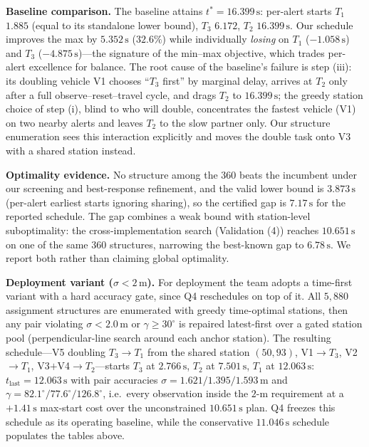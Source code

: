 \textbf{Baseline comparison.} The baseline attains $t^{*}=16.399\,\mathrm{s}$: per-alert
starts $T_1$ $1.885$ (equal to its standalone lower bound), $T_3$ $6.172$, $T_2$
$16.399\,\mathrm{s}$. Our schedule improves the max by $5.352\,\mathrm{s}$
($32.6\%$) while individually \emph{losing} on $T_1$ ($-1.058\,\mathrm{s}$) and $T_3$
($-4.875\,\mathrm{s}$)---the signature of the min--max objective, which trades per-alert
excellence for balance. The root cause of the baseline's failure is step (iii): its
doubling vehicle V1 chooses ``$T_3$ first'' by marginal delay, arrives at $T_2$ only
after a full observe--reset--travel cycle, and drags $T_2$ to $16.399\,\mathrm{s}$;
the greedy station choice of step (i), blind to who will double, concentrates the
fastest vehicle (V1) on two nearby alerts and leaves $T_2$ to the slow partner only.
Our structure enumeration sees this interaction explicitly and moves the double task
onto V3 with a shared station instead.

\textbf{Optimality evidence.} No structure among the 360 beats the incumbent under our
screening and best-response refinement, and the valid lower bound is $3.873\,\mathrm{s}$
(per-alert earliest starts ignoring sharing), so the certified gap is $7.17\,\mathrm{s}$
for the reported schedule. The gap combines a weak bound with station-level
suboptimality: the cross-implementation search (Validation (4)) reaches
$10.651\,\mathrm{s}$ on one of the same 360 structures, narrowing the best-known gap to
$6.78\,\mathrm{s}$. We report both rather than claiming global optimality.

\textbf{Deployment variant ($\sigma<2\,\mathrm{m}$).} For deployment the team adopts a
time-first variant with a hard accuracy gate, since Q4 reschedules on top of it. All
$5{,}880$ assignment structures are enumerated with greedy time-optimal stations, then
any pair violating $\sigma<2.0\,\mathrm{m}$ or $\gamma\ge30^\circ$ is repaired
latest-first over a gated station pool (perpendicular-line search around each anchor
station). The resulting schedule---V5 doubling $T_3\!\to\!T_1$ from the shared station
$(50,93)$, V1$\to T_3$, V2$\to T_1$, V3$+$V4$\to T_2$---starts $T_3$ at
$2.766\,\mathrm{s}$, $T_2$ at $7.501\,\mathrm{s}$, $T_1$ at $12.063\,\mathrm{s}$:
$t_{\mathrm{last}}=12.063\,\mathrm{s}$ with pair accuracies
$\sigma=1.621/1.395/1.593\,\mathrm{m}$ and
$\gamma=82.1^\circ/77.6^\circ/126.8^\circ$, i.e.\ every observation inside the $2$-m
requirement at a $+1.41\,\mathrm{s}$ max-start cost over the unconstrained
$10.651\,\mathrm{s}$ plan. Q4 freezes this schedule as its operating baseline, while
the conservative $11.046\,\mathrm{s}$ schedule populates the tables above.

